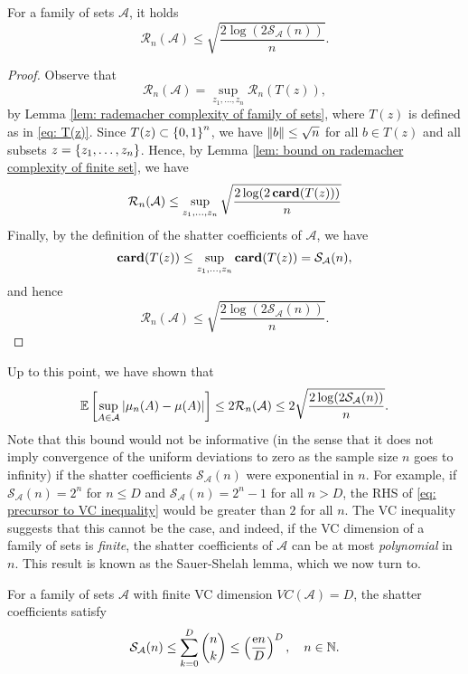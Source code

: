 \begin{proposition}
\label{prop: bound on rademacher complexity of family of sets}
For a family of sets $\mathcal{A}$, it holds
\[
    \mathcal{R}_n(\mathcal{A}) \leq \sqrt{ \frac{2 \log(2 \mathcal{S}_{\mathcal{A}}(n)) }{n} }.
\]
\end{proposition}

\begin{proof}
Observe that
\[
    \mathcal{R}_n(\mathcal{A}) = \sup_{z_1, \dots, z_n} \mathcal{R}_n(T(z)),
\]
by Lemma \ref{lem: rademacher complexity of family of sets}, where $T(z)$ is defined as in \eqref{eq: T(z)}. Since $T(z) \subset \left\{0, 1\right\}^n$, we have $\norm{b} \leq \sqrt{n}$ for all $b \in T(z)$ and all subsets $z = \left\{z_1, \dots, z_n\right\}$. Hence, by Lemma \ref{lem: bound on rademacher complexity of finite set}, we have
\[
    \mathcal{R}_n(\mathcal{A}) \leq \sup_{z_1, \dots, z_n} \sqrt{\frac{2 \log(2 \, \mathrm{\mathbf{card}}(T(z)))}{n}}
\]
Finally, by the definition of the shatter coefficients of $\mathcal{A}$, we have
\[
    \mathrm{\mathbf{card}}(T(z)) \leq \sup_{z_1, \dots, z_n} \mathrm{\mathbf{card}}(T(z)) = \mathcal{S}_{\mathcal{A}}(n),
\]
and hence
\[
    \mathcal{R}_n(\mathcal{A}) \leq \sqrt{ \frac{2 \log(2 \mathcal{S}_{\mathcal{A}}(n)) }{n} }.
\]
\end{proof}

Up to this point, we have shown that
\begin{equation}
\label{eq: precursor to VC inequality}
    \mathbb{E}\left[ \sup_{A \in \mathcal{A}} \abs{\mu_n(A) - \mu(A)} \right] \leq 2 \mathcal{R}_n(\mathcal{A}) \leq 2 \sqrt{ \frac{2 \log(2 \mathcal{S}_{\mathcal{A}}(n)) }{n} }.
\end{equation}
Note that this bound would not be informative (in the sense that it does not imply convergence of the uniform deviations to zero as the sample size $n$ goes to infinity) if the shatter coefficients $\mathcal{S}_{\mathcal{A}}(n)$ were exponential in $n$. For example, if $\mathcal{S}_{\mathcal{A}}(n) = 2^n$ for $n \leq D$ and $\mathcal{S}_{\mathcal{A}}(n) = 2^n - 1$ for all $n > D$, the RHS of \eqref{eq: precursor to VC inequality} would be greater than $2$ for all $n$. The VC inequality suggests that this cannot be the case, and indeed, if the VC dimension of a family of sets is \emph{finite}, the shatter coefficients of $\mathcal{A}$ can be at most \emph{polynomial} in $n$. This result is known as the Sauer-Shelah lemma, which we now turn to.

\begin{lemma}
For a family of sets $\mathcal{A}$ with finite VC dimension $VC(\mathcal{A}) = D$, the shatter coefficients satisfy
\[
    \mathcal{S}_{\mathcal{A}}(n) \leq \sum_{k=0}^D \binom{n}{k} \leq \left( \frac{\mathrm{e} n}{D} \right)^D, \quad n \in \mathbb{N}.
\]
\end{lemma}

